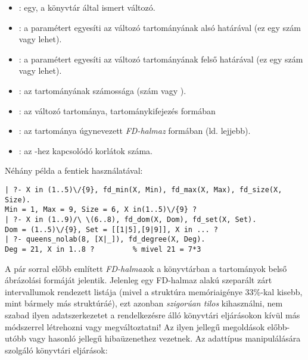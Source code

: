 \begin{itemize}
\item {}:  egy, a \clpfd könyvtár által ismert változó.
\item {}: a  paramétert egyesíti az 
változó tartományának alsó határával (ez egy szám vagy  lehet).
\item {}: a  paramétert egyesíti az 
változó tartományának felső határával (ez egy szám vagy  lehet).
\item {}:  az  tartományának számossága
(szám vagy ).
\item {}:  az  változó tartománya,
tartománykifejezés formában
\item {}:  az  tartománya úgynevezett
\emph{FD-halmaz} formában (ld. lejjebb).
\item {}:  az -hez kapcsolódó korlátok
száma.
\end{itemize}

Néhány példa a fentiek használatával:

\begin{verbatim}
| ?- X in (1..5)\/{9}, fd_min(X, Min), fd_max(X, Max), fd_size(X, Size).
Min = 1, Max = 9, Size = 6, X in(1..5)\/{9} ?
| ?- X in (1..9)/\ \(6..8), fd_dom(X, Dom), fd_set(X, Set).
Dom = (1..5)\/{9}, Set = [[1|5],[9|9]], X in ... ?
| ?- queens_nolab(8, [X|_]), fd_degree(X, Deg).
Deg = 21, X in 1..8 ?         % mivel 21 = 7*3
\end{verbatim}

A pár sorral előbb említett \emph{FD-halmaz}ok a \clpfd könyvtárban a
tartományok belső ábrázolási formáját jelentik. Jelenleg egy FD-halmaz
 alakú szeparált zárt intervallumok rendezett listája (mivel
a  struktúra memóriaigénye 33\%-kal kisebb, mint bármely más
 struktúráé), ezt azonban \emph{szigorúan tilos} kihasználni, nem
szabad ilyen adatszerkezetet a rendelkezésre álló könyvtári eljárásokon
kívül más módszerrel létrehozni vagy megváltoztatni! Az ilyen jellegű
megoldások előbb-utóbb  vagy hasonló jellegű
hibaüzenethez vezetnek.
\br
Az adattípus manipulálására szolgáló könyvtári eljárások:

